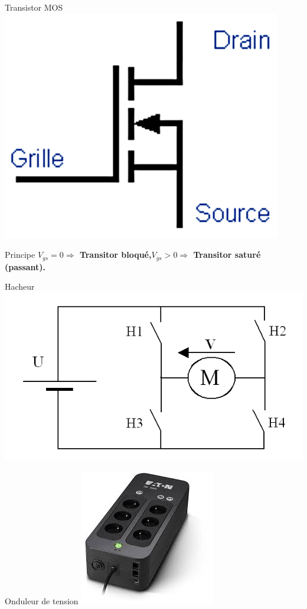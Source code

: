 \documentclass{beamer}
\begin{document}
\begin{frame}{Transistor MOS}
  \includegraphics[height=.3\textheight]{images/mos}
  \begin{alertblock}{Principe}
    \textbf{$V_{gs} =0 \Rightarrow$ Transitor bloqué,\hfill $V_{gs} >0 \Rightarrow$ Transitor saturé (passant).}
  \end{alertblock}
\end{frame}

\begin{frame}{Hacheur}
  \centering
  \includegraphics[height=.4\textheight]{images/hacheur}
\end{frame}

\begin{frame}{Onduleur de tension}
  \centering
  \includegraphics[height=.4\textheight]{images/onduleur}
\end{frame}
\end{document}
